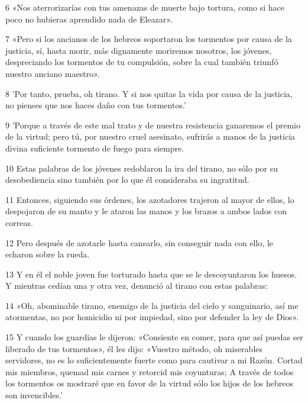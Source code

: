 \par 6 «Nos aterrorizarías con tus amenazas de muerte bajo tortura, como si hace poco no hubieras aprendido nada de Eleazar».

\par 7 «Pero si los ancianos de los hebreos soportaron los tormentos por causa de la justicia, sí, hasta morir, más dignamente moriremos nosotros, los jóvenes, despreciando los tormentos de tu compulsión, sobre la cual también triunfó nuestro anciano maestro».

\par 8 'Por tanto, prueba, oh tirano. Y si nos quitas la vida por causa de la justicia, no pienses que nos haces daño con tus tormentos.'

\par 9 'Porque a través de este mal trato y de nuestra resistencia ganaremos el premio de la virtud; pero tú, por nuestro cruel asesinato, sufrirás a manos de la justicia divina suficiente tormento de fuego para siempre.

\par 10 Estas palabras de los jóvenes redoblaron la ira del tirano, no sólo por su desobediencia sino también por lo que él consideraba su ingratitud.

\par 11 Entonces, siguiendo sus órdenes, los azotadores trajeron al mayor de ellos, lo despojaron de su manto y le ataron las manos y los brazos a ambos lados con correas.

\par 12 Pero después de azotarle hasta cansarlo, sin conseguir nada con ello, le echaron sobre la rueda.

\par 13 Y en él el noble joven fue torturado hasta que se le descoyuntaron los huesos. Y mientras cedían una y otra vez, denunció al tirano con estas palabras:

\par 14 «Oh, abominable tirano, enemigo de la justicia del cielo y sanguinario, así me atormentas, no por homicidio ni por impiedad, sino por defender la ley de Dios».

\par 15 Y cuando los guardias le dijeron: «Consiente en comer, para que así puedas ser liberado de tus tormentos», él les dijo: «Vuestro método, oh miserables servidores, no es lo suficientemente fuerte como para cautivar a mi Razón. Cortad mis miembros, quemad mis carnes y retorcid mis coyunturas; A través de todos los tormentos os mostraré que en favor de la virtud sólo los hijos de los hebreos son invencibles.'

